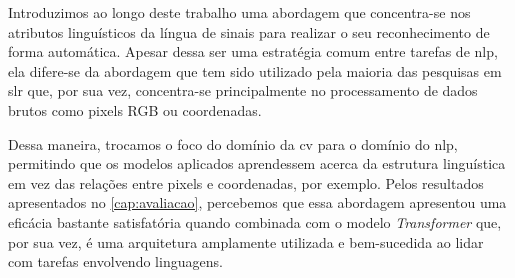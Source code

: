 Introduzimos ao longo deste trabalho uma abordagem que concentra-se nos atributos linguísticos da língua de sinais para realizar o seu reconhecimento de forma automática.
Apesar dessa ser uma estratégia comum entre tarefas de \acrfull{nlp}, ela difere-se da abordagem que tem sido utilizado pela maioria das pesquisas em \acrfull{slr} que, por sua vez, concentra-se principalmente no processamento de dados brutos como pixels RGB ou coordenadas.


Dessa maneira, trocamos o foco do domínio da \acrfull{cv} para o domínio do \acrshort{nlp}, permitindo que os modelos aplicados aprendessem acerca da estrutura linguística em vez das relações entre pixels e coordenadas, por exemplo.
Pelos resultados apresentados no \autoref{cap:avaliacao}, percebemos que essa abordagem apresentou uma eficácia bastante satisfatória quando combinada com o modelo \textit{Transformer} que, por sua vez, é uma arquitetura amplamente utilizada e bem-sucedida ao lidar com tarefas envolvendo linguagens.


